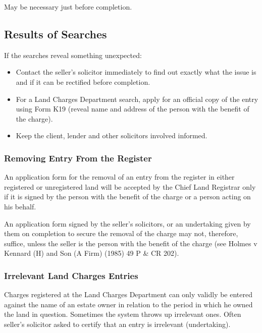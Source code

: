 \documentclass[
]{article}
\providecommand{\tightlist}{%
  \setlength{\itemsep}{0pt}\setlength{\parskip}{0pt}}
\begin{document}
May be necessary just before completion.

\hypertarget{results-of-searches}{%
\subsection{Results of Searches}\label{results-of-searches}}

If the searches reveal something unexpected:

\begin{itemize}
\tightlist
\item
  Contact the seller's solicitor immediately to find out exactly what
  the issue is and if it can be rectified before completion.
\item
  For a Land Charges Department search, apply for an official copy of
  the entry using Form K19 (reveal name and address of the person with
  the benefit of the charge).
\item
  Keep the client, lender and other solicitors involved informed.
\end{itemize}

\hypertarget{removing-entry-from-the-register}{%
\subsubsection{Removing Entry From the
Register}\label{removing-entry-from-the-register}}

An application form for the removal of an entry from the register in
either registered or unregistered land will be accepted by the Chief
Land Registrar only if it is signed by the person with the benefit of
the charge or a person acting on his behalf.

An application form signed by the seller's solicitors, or an undertaking
given by them on completion to secure the removal of the charge may not,
therefore, suffice, unless the seller is the person with the benefit of
the charge (see Holmes v Kennard (H) and Son (A Firm) (1985) 49 P \& CR
202).

\hypertarget{irrelevant-land-charges-entries}{%
\subsubsection{Irrelevant Land Charges
Entries}\label{irrelevant-land-charges-entries}}

Charges registered at the Land Charges Department can only validly be
entered against the name of an estate owner in relation to the period in
which he owned the land in question. Sometimes the system throws up
irrelevant ones. Often seller's solicitor asked to certify that an entry
is irrelevant (undertaking).
\end{document}
